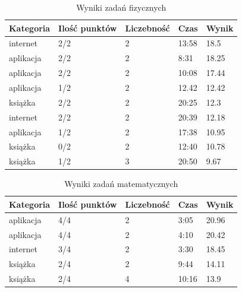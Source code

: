 \documentclass[10pt]{beamer}
\begin{document}
\begin{frame}
  \begin{table}[H]
    \caption{Wyniki zadań fizycznych}
    \centering
    \begin{tabular}{@{}lllll@{}}
      \toprule
      Kategoria & Ilość punktów & Liczebność & Czas & Wynik \\
      \midrule
      internet & 2/2 & 2 & 13:58 & 18.5 \\
      aplikacja & 2/2 & 2 & 8:31 & 18.25 \\
      aplikacja & 2/2 & 2 & 10:08 & 17.44 \\
      aplikacja & 1/2 & 2 & 12.42 & 12.42 \\
      książka & 2/2 & 2 & 20:25 & 12.3 \\
      internet & 2/2 & 2 & 20:39 & 12.18 \\
      aplikacja & 1/2 & 2 & 17:38 & 10.95 \\
      książka & 0/2 & 2 & 12:40 & 10.78 \\
      książka & 1/2 & 3 & 20:50 & 9.67 \\
      \bottomrule
    \end{tabular}
  \end{table}

\end{frame}

\begin{frame}
  \begin{table}[H]
    \caption{Wyniki zadań matematycznych}
    \centering
    \begin{tabular}{@{}lllll@{}}
      \toprule
      Kategoria & Ilość punktów & Liczebność & Czas & Wynik \\
      \midrule
      aplikacja & 4/4 & 2 & 3:05 & 20.96 \\
      aplikacja & 4/4 & 2 & 4:10 & 20.42 \\
      internet & 3/4 & 2 & 3:30 & 18.45\\
      książka & 2/4 & 2 & 9:44 & 14.11 \\
      książka & 2/4 & 4 & 10:16 & 13.9 \\
      \bottomrule
    \end{tabular}
  \end{table}

\end{frame}
\end{document}
